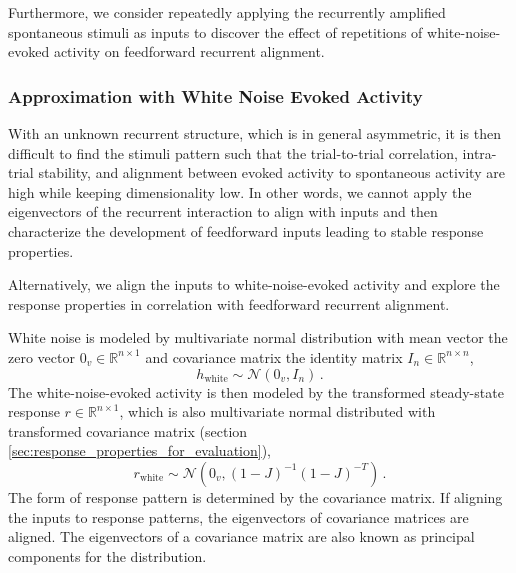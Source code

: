 \documentclass[11pt]{article}
\begin{document}
	Furthermore, we consider repeatedly applying the recurrently amplified spontaneous stimuli as inputs to discover the effect of repetitions of white-noise-evoked activity on feedforward recurrent alignment. 
	
	\subsubsection{Approximation with White Noise Evoked Activity} \label{sec:white_noise_approx_ffrec}%
	With an unknown recurrent structure, which is in general asymmetric, it is then difficult to find the stimuli pattern such that the trial-to-trial correlation, intra-trial stability, and alignment between evoked activity to spontaneous activity are high while keeping dimensionality low. In other words, we cannot apply the eigenvectors of the recurrent interaction to align with inputs and then characterize the development of feedforward inputs leading to stable response properties. 
	
	Alternatively, we align the inputs to white-noise-evoked activity and explore the response properties in correlation with feedforward recurrent alignment. 
		
	White noise is modeled by multivariate normal distribution with mean vector the zero vector $0_v \in \mathbb{R}^{n \times 1}$ and covariance matrix the identity matrix $I_n \in \mathbb{R}^{n \times n}$, 
		\begin{equation}
			h_{\text{white}} \sim \mathcal{N}(0_v, I_n) \, .
		\end{equation}
	The white-noise-evoked activity is then modeled by the transformed steady-state response $r \in \mathbb{R}^{n \times 1}$, which is also multivariate normal distributed with transformed covariance matrix (section \ref{sec:response_properties_for_evaluation}), 
		\begin{equation} \label{eq:white_noise_evoked_act}
			r_{\text{white}} \sim \mathcal{N}\left(0_v, (1-J)^{-1}(1-J)^{-T}\right) \, .
		\end{equation}
	The form of response pattern is determined by the covariance matrix. If aligning the inputs to response patterns, the eigenvectors of covariance matrices are aligned. The eigenvectors of a covariance matrix are also known as principal components for the distribution. 
	
\end{document}
